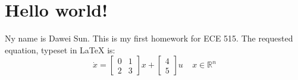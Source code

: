 \documentclass[12pt]{article}
\begin{document}
\section*{Hello world!}
Ny name is Dawei Sun. This is my first homework for ECE 515.
The requested equation, typeset in LaTeX is:
$$\dot{x} = \begin{bmatrix} 0 & 1\\2 & 3\end{bmatrix} x + \begin{bmatrix}4\\5\end{bmatrix}u ~~~~~ x\in\mathbb{R}^n$$
\end{document}
